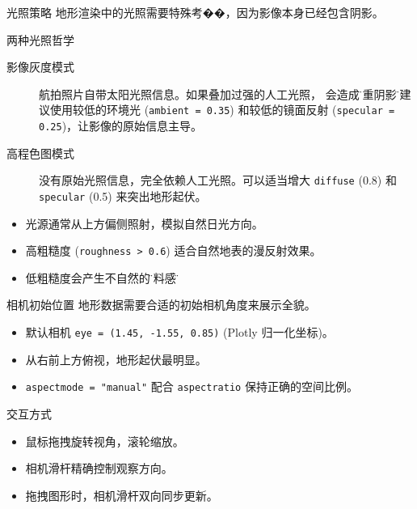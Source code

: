 \documentclass[aspectratio=169,11pt]{ctexbeamer}
\begin{document}
\begin{frame}{光照策略}
  地形渲染中的光照需要特殊考��，因为影像本身已经包含阴影。

  \begin{block}{两种光照哲学}
    \begin{description}
      \item[影像灰度模式] 航拍照片自带太阳光照信息。如果叠加过强的人工光照，
        会造成\"双重阴影\"。建议使用较低的环境光 (\texttt{ambient = 0.35})
        和较低的镜面反射 (\texttt{specular = 0.25})，让影像的原始信息主导。
      \item[高程色图模式] 没有原始光照信息，完全依赖人工光照。可以适当增大
        \texttt{diffuse} (0.8) 和 \texttt{specular} (0.5) 来突出地形起伏。
    \end{description}
  \end{block}

  \begin{itemize}
    \item 光源通常从上方偏侧照射，模拟自然日光方向。
    \item 高粗糙度 (\texttt{roughness > 0.6}) 适合自然地表的漫反射效果。
    \item 低粗糙度会产生不自然的\"塑料感\"。
  \end{itemize}
\end{frame}

\begin{frame}{相机初始位置}
  地形数据需要合适的初始相机角度来展示全貌。

  \begin{itemize}
    \item 默认相机 \texttt{eye = (1.45, -1.55, 0.85)} (Plotly 归一化坐标)。
    \item 从右前上方俯视，地形起伏最明显。
    \item \texttt{aspectmode = "manual"} 配合 \texttt{aspectratio} 保持正确的空间比例。
  \end{itemize}

  \begin{block}{交互方式}
    \begin{itemize}
      \item 鼠标拖拽旋转视角，滚轮缩放。
      \item 相机滑杆精确控制观察方向。
      \item 拖拽图形时，相机滑杆双向同步更新。
    \end{itemize}
  \end{block}
\end{frame}
\end{document}
